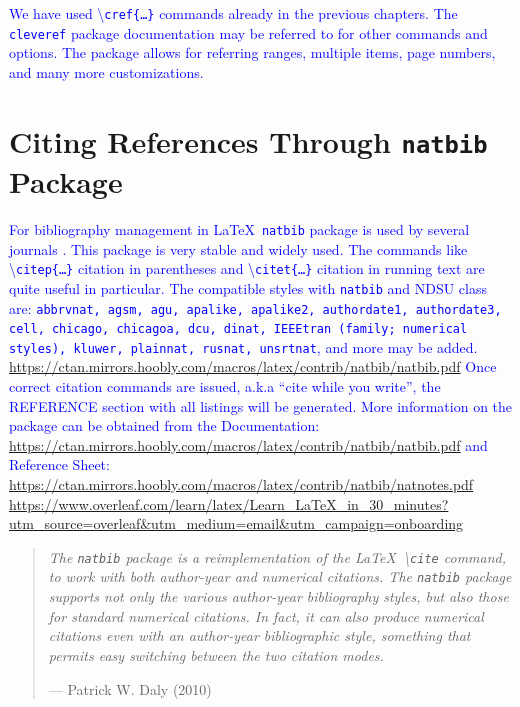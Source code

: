 \documentclass[phd,showframe]{ndsu-thesis-2022}
\newcommand\italk[1]{\textcolor{blue}{#1}}  %
\newcommand\cmd[1]{\textbackslash\texttt{#1}}  %
\newcommand\vb[1]{\textcolor{blue}{\texttt{#1}}}%
\begin{document}
\italk{We have used \cmd{cref\{\ldots\}} commands already in the previous chapters. The \vb{cleveref} package documentation may be referred to for other commands and options. The package allows for referring ranges, multiple items, page numbers, and many more customizations.  
}



\section{Citing References Through \texttt{natbib} Package}
\italk{For bibliography management in \LaTeX\ \texttt{natbib} package is used by several journals \citep{daly2010natural}. This package is very stable and widely used. The commands like \cmd{citep\{\ldots\}} citation in parentheses and \cmd{citet\{\ldots\}} citation in running text are quite useful in particular. The compatible styles with \texttt{natbib} and NDSU class are:  \texttt{abbrvnat, agsm, agu, apalike, apalike2, authordate1, authordate3, cell, chicago, chicagoa, dcu, dinat, IEEEtran (family;  numerical styles), kluwer, plainnat, rusnat, unsrtnat}, and more may be added. \url{https://ctan.mirrors.hoobly.com/macros/latex/contrib/natbib/natbib.pdf} Once correct citation commands are issued, a.k.a ``cite while you write'', the REFERENCE section with all listings will be generated. More information on the package can be obtained from the Documentation: \textcolor{magenta}{\url{https://ctan.mirrors.hoobly.com/macros/latex/contrib/natbib/natbib.pdf}} and Reference Sheet: \!\!\textcolor{magenta}{\url{https://ctan.mirrors.hoobly.com/macros/latex/contrib/natbib/natnotes.pdf}}
\textcolor{magenta}{\url{https://www.overleaf.com/learn/latex/Learn_LaTeX_in_30_minutes?utm_source=overleaf&utm_medium=email&utm_campaign=onboarding}}}



\begin{quote}
\singlespacing
\raggedleft
\textit{The \texttt{natbib} package is a reimplementation of the \LaTeX\ \cmd{cite} command, to work with both author-year and numerical citations. The \texttt{natbib} package supports not only the various author-year bibliography styles, but also those for standard numerical citations. In fact, it can also produce numerical citations even with an author-year bibliographic style, something that permits easy switching between the two citation modes.} 

\hfill --- Patrick W. Daly (2010)
\end{quote}
\end{document}
